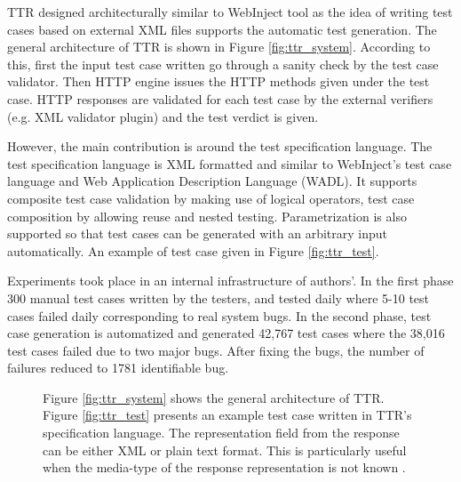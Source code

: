 \documentclass[english]{tktltiki}
\begin{document}
TTR designed architecturally similar to WebInject \cite{webinject} tool as the idea of writing test cases based on external XML files supports the automatic test generation. The general architecture of TTR is shown in Figure \ref{fig:ttr_system}. According to this, first the input test case written go through a sanity check by the test case validator. Then HTTP engine issues the HTTP methods given under the test case. HTTP responses are validated for each test case by the external verifiers (e.g. XML validator plugin) and the test verdict is given. 

However, the main contribution is around the test specification language. The test specification language is XML formatted and similar to WebInject's test case language and Web Application Description Language (WADL). It supports composite test case validation by making use of logical operators, test case composition by allowing reuse and nested testing. Parametrization is also supported so that test cases can be generated with an arbitrary input automatically. An example of test case given in Figure \ref{fig:ttr_test}.

Experiments took place in an internal infrastructure of authors'. In the first phase 300 manual test cases written by the testers, and tested daily where 5-10 test cases failed daily corresponding to real system bugs. In the second phase, test case generation is automatized and generated 42,767 test cases where the 38,016 test cases failed due to two major bugs. After fixing the bugs, the number of failures reduced to 1781 identifiable bug. 
\begin{figure}[h]
	\centering
	\hfill%
	\caption{Figure \ref{fig:ttr_system} shows the general architecture of TTR. Figure \ref{fig:ttr_test} presents an example test case written in TTR's specification language. The representation field from the response can be either XML or plain text format. This is particularly useful when the media-type of the response representation is not known \cite{chakrabarti2009test}.}
\end{figure}
\end{document}
